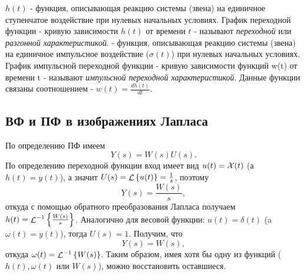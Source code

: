 \documentclass[../../TAU.tex]{subfiles}
\begin{document}
     $h(t)$  - функция, описывающая реакцию системы (звена) на единичное ступенчатое воздействие при нулевых начальных условиях. 
    График переходной функции - кривую зависимости $h(t)$ от времени $t$ - называют {\it переходной} или {\it разгонной характеристикой}.
     - функция, описывающая реакцию системы (звена) на единичное импульсное воздействие ($\sigma(t)$) при нулевых начальных условиях.\\ 
    График импульсной переходной функции - кривую зависимости функций w(t) от времени t - называют {\it импульсной переходной характеристикой}.
    Данные функции связаны соотношением - $w(t) = \frac{dh(t)}{dt}$.

\subsection{ВФ и ПФ в изображениях Лапласа } %
    По определению ПФ имеем
    $$
        Y(s) = W(s)U(s).
    $$
    По определению переходной функции вход имеет вид 
    $u(t) = \mathcal{X}(t)$ 
    (а~$h(t) = y(t)$), а значит 
    $U(s) = \mathop{\mathcal{L}}\nolimits\left\{u(t)\right\} = \frac{1}{s}$, поэтому
    $$
        Y(s) = \frac{W(s)}{s},
    $$
    откуда с помощью обратного преобразования Лапласа получаем 
    $h(t) = {\mathop{\mathcal{L}}\nolimits^{-1}\left\{\frac{W(s)}{s}\right\}}$.
    Аналогично для весовой функции: 
    $u(t) = \delta(t)$ 
    (a $\omega(t) = y(t)$), тогда $U(s)=1$. Получим, что
    $$
        Y(s) = W(s),
    $$
    откуда 
    $\omega(t) = {\mathop{\mathcal{L}}\nolimits^{-1}\left\{W(s)\right\}}$.
    Таким образом, имея хотя бы одну из функций ($h(t), \omega(t)$ или $W(s)$), можно восстановить оставшиеся.
\end{document}
